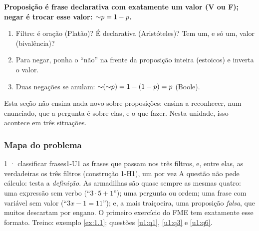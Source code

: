 \begin{paralembrar}\label{lembrar-u1}
\textbf{Proposição é frase declarativa com exatamente um valor (V ou F); negar é trocar esse valor: ${\sim} p = 1-p$.}
\begin{enumerate}[label=\arabic*.,leftmargin=1.4em]
  \item Filtre: é oração (Platão)? É declarativa (Aristóteles)? Tem um, e só um, valor (bivalência)?
  \item Para negar, ponha o \enquote{não} na frente da proposição inteira (estoicos) e inverta o valor.
  \item Duas negações se anulam: ${\sim}({\sim} p) = 1-(1-p) = p$ (Boole).
\end{enumerate}
\end{paralembrar}

\OndeEUsado

Esta seção não ensina nada novo sobre proposições: ensina a reconhecer, num enunciado, que a pergunta é sobre elas, e o que fazer. Nesta unidade, isso acontece em três situações.

\subsubsection{Mapa do problema}

\begin{caso}{1 · classificar frases}{1-U1}
{as frases que passam nos três filtros, e, entre elas, as verdadeiras}
{os três filtros (construção 1-H1), um por vez}
\reconhecer A questão não pede cálculo: testa a \emph{definição}. As armadilhas são quase sempre as mesmas quatro: uma expressão sem verbo (\enquote{$3\cdot5+1$}); uma pergunta ou ordem; uma frase com variável sem valor (\enquote{$3x-1=11$}); e, a mais traiçoeira, uma proposição \emph{falsa}, que muitos descartam por engano. O primeiro exercício do FME tem exatamente esse formato. Treino: exemplo \ref{ex:1.1}; questões \ref{u1:q1}, \ref{u1:q3} e \ref{u1:q6}.
\end{caso}

